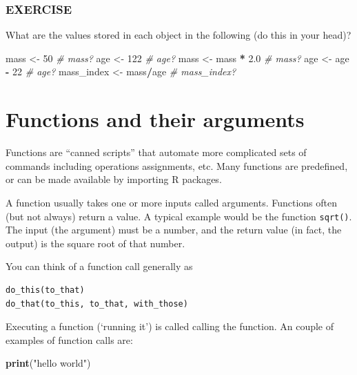 \documentclass[]{book}
\newenvironment{Shaded}{\begin{snugshade}}{\end{snugshade}}
\newcommand{\CommentTok}[1]{\textcolor[rgb]{0.56,0.35,0.01}{\textit{#1}}}
\newcommand{\DecValTok}[1]{\textcolor[rgb]{0.00,0.00,0.81}{#1}}
\newcommand{\FloatTok}[1]{\textcolor[rgb]{0.00,0.00,0.81}{#1}}
\newcommand{\KeywordTok}[1]{\textcolor[rgb]{0.13,0.29,0.53}{\textbf{#1}}}
\newcommand{\NormalTok}[1]{#1}
\newcommand{\OperatorTok}[1]{\textcolor[rgb]{0.81,0.36,0.00}{\textbf{#1}}}
\newcommand{\StringTok}[1]{\textcolor[rgb]{0.31,0.60,0.02}{#1}}
\begin{document}
\hypertarget{exercise-4}{%
\subsubsection*{EXERCISE}\label{exercise-4}}

What are the values stored in each object in the following (do this in your head)?

\begin{Shaded}
\begin{Highlighting}[]
\NormalTok{mass <-}\StringTok{ }\DecValTok{50}              \CommentTok{# mass?}
\NormalTok{age  <-}\StringTok{ }\DecValTok{122}             \CommentTok{# age?}
\NormalTok{mass <-}\StringTok{ }\NormalTok{mass }\OperatorTok{*}\StringTok{ }\FloatTok{2.0}      \CommentTok{# mass?}
\NormalTok{age  <-}\StringTok{ }\NormalTok{age }\OperatorTok{-}\StringTok{ }\DecValTok{22}        \CommentTok{# age?}
\NormalTok{mass_index <-}\StringTok{ }\NormalTok{mass}\OperatorTok{/}\NormalTok{age  }\CommentTok{# mass_index?}
\end{Highlighting}
\end{Shaded}

\hypertarget{functions-and-their-arguments}{%
\section{Functions and their arguments}\label{functions-and-their-arguments}}

Functions are ``canned scripts'' that automate more complicated sets of commands including operations assignments, etc. Many functions are predefined, or can be made available by importing R packages.

A function usually takes one or more inputs called arguments. Functions often (but not always) return a value. A typical example would be the function \texttt{sqrt()}. The input (the argument) must be a number, and the return value (in fact, the output) is the square root of that number.

You can think of a function call generally as

\begin{verbatim}
do_this(to_that)
do_that(to_this, to_that, with_those)
\end{verbatim}

Executing a function (`running it') is called calling the function. An couple of examples of function calls are:

\begin{Shaded}
\begin{Highlighting}[]
\KeywordTok{print}\NormalTok{(}\StringTok{"hello world"}\NormalTok{)}
\end{Highlighting}
\end{Shaded}
\end{document}
